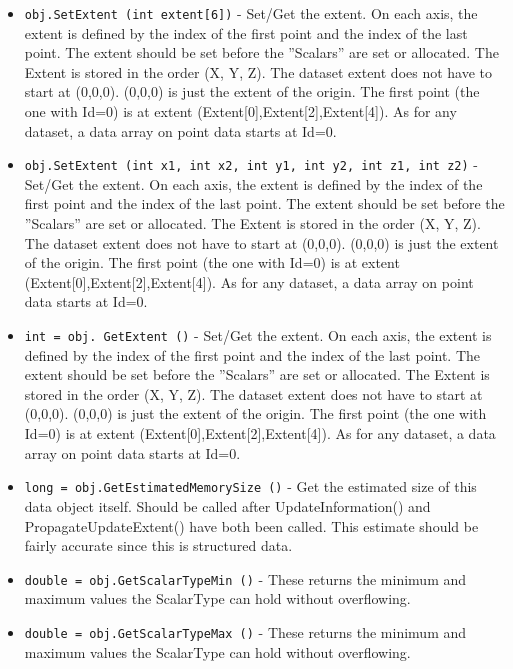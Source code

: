\begin{itemize}
\item  \verb|obj.SetExtent (int extent[6])| -  Set/Get the extent. On each axis, the extent is defined by the index
 of the first point and the index of the last point.  The extent should
 be set before the ''Scalars'' are set or allocated.  The Extent is
 stored in the order (X, Y, Z).
 The dataset extent does not have to start at (0,0,0). (0,0,0) is just the
 extent of the origin.
 The first point (the one with Id=0) is at extent
 (Extent[0],Extent[2],Extent[4]). As for any dataset, a data array on point
 data starts at Id=0.

\item  \verb|obj.SetExtent (int x1, int x2, int y1, int y2, int z1, int z2)| -  Set/Get the extent. On each axis, the extent is defined by the index
 of the first point and the index of the last point.  The extent should
 be set before the ''Scalars'' are set or allocated.  The Extent is
 stored in the order (X, Y, Z).
 The dataset extent does not have to start at (0,0,0). (0,0,0) is just the
 extent of the origin.
 The first point (the one with Id=0) is at extent
 (Extent[0],Extent[2],Extent[4]). As for any dataset, a data array on point
 data starts at Id=0.

\item  \verb|int = obj. GetExtent ()| -  Set/Get the extent. On each axis, the extent is defined by the index
 of the first point and the index of the last point.  The extent should
 be set before the ''Scalars'' are set or allocated.  The Extent is
 stored in the order (X, Y, Z).
 The dataset extent does not have to start at (0,0,0). (0,0,0) is just the
 extent of the origin.
 The first point (the one with Id=0) is at extent
 (Extent[0],Extent[2],Extent[4]). As for any dataset, a data array on point
 data starts at Id=0.

\item  \verb|long = obj.GetEstimatedMemorySize ()| -  Get the estimated size of this data object itself. Should be called
 after UpdateInformation() and PropagateUpdateExtent() have both been
 called. This estimate should be fairly accurate since this is structured
 data.

\item  \verb|double = obj.GetScalarTypeMin ()| -  These returns the minimum and maximum values the ScalarType can hold
 without overflowing.

\item  \verb|double = obj.GetScalarTypeMax ()| -  These returns the minimum and maximum values the ScalarType can hold
 without overflowing.


\end{itemize}

